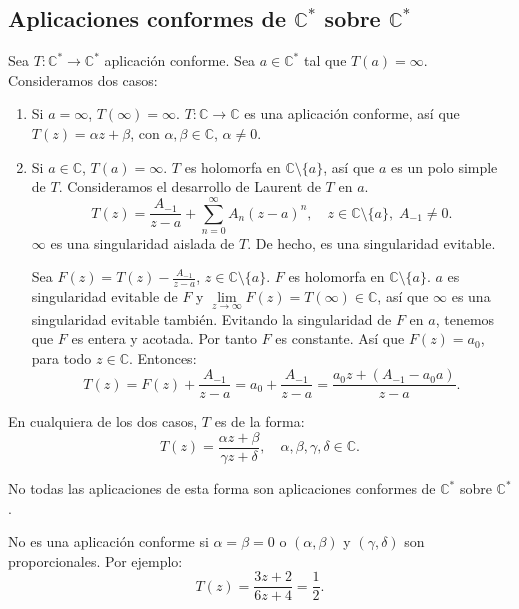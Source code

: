 \subsection*{Aplicaciones conformes de $\mathbb{C}^\ast$ sobre $\mathbb{C}^\ast$}
Sea $T: \mathbb{C}^\ast \to \mathbb{C}^\ast$ aplicación conforme.
Sea $a \in \mathbb{C}^\ast$ tal que $T(a) = \infty$.
Consideramos dos casos:
\begin{enumerate}
    \item Si $a = \infty$, $T(\infty) = \infty$.
          $T: \mathbb{C} \to \mathbb{C}$ es una aplicación conforme, así que $T(z) = \alpha z + \beta$, con $\alpha, \beta \in \mathbb{C}$, $\alpha \neq 0$.
    \item Si $a \in \mathbb{C}$, $T(a) = \infty$.
          $T$ es holomorfa en $\mathbb{C} \setminus \{a\}$, así que $a$ es un polo simple de $T$.
          Consideramos el desarrollo de Laurent de $T$ en $a$.
          $$T(z) = \frac{A_{-1}}{z-a} + \sum_{n=0}^\infty A_n(z-a)^n, \quad z \in \mathbb{C} \setminus \{a\}, \; A_{-1} \neq 0.$$
          $\infty$ es una singularidad aislada de $T$.
          De hecho, es una singularidad evitable.

          Sea $F(z) = T(z) - \frac{A_{-1}}{z-a}$, $z \in \mathbb{C} \setminus \{a\}$.
          $F$ es holomorfa en $\mathbb{C} \setminus \{a\}$.
          $a$ es singularidad evitable de $F$ y $\lim\limits_{z \to \infty} F(z) = T(\infty) \in \mathbb{C}$, así que $\infty$ es una singularidad evitable también.
          Evitando la singularidad de $F$ en $a$, tenemos que $F$ es entera y acotada.
          Por tanto $F$ es constante.
          Así que $F(z) = a_0$, para todo $z \in \mathbb{C}$.
          Entonces:
          $$T(z) = F(z) + \frac{A_{-1}}{z-a} = a_0 + \frac{A_{-1}}{z-a} = \frac{a_0z + (A_{-1}-a_0a)}{z-a}.$$
\end{enumerate}

En cualquiera de los dos casos, $T$ es de la forma:
$$T(z) = \frac{\alpha z + \beta}{\gamma z + \delta}, \quad \alpha, \beta, \gamma, \delta \in \mathbb{C}.$$

No todas las aplicaciones de esta forma son aplicaciones conformes de $\mathbb{C}^\ast$ sobre $\mathbb{C}^\ast$.

\begin{example}[Contraejemplo]
    No es una aplicación conforme si $\alpha = \beta = 0$ o $(\alpha, \beta)$ y $(\gamma, \delta)$ son proporcionales.
    Por ejemplo:
    $$T(z) = \frac{3z + 2}{6z + 4} = \frac{1}{2}.$$
\end{example}

